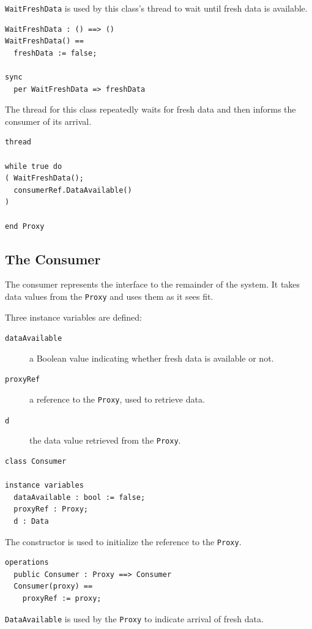 \documentclass{overturerepchap}
\begin{document}
\texttt{WaitFreshData} is used by this class's thread to wait until
fresh data is available.

\begin{lstlisting}
WaitFreshData : () ==> ()
WaitFreshData() ==
  freshData := false;

sync
  per WaitFreshData => freshData
\end{lstlisting}

The thread for this class repeatedly waits for fresh data and then
informs the consumer of its arrival.

\begin{lstlisting}
thread

while true do
( WaitFreshData();
  consumerRef.DataAvailable()
)

end Proxy
\end{lstlisting}

\subsection{The Consumer}

The consumer represents the interface to the remainder of the
system. It takes data values from the \texttt{Proxy} and uses them as
it sees fit.

Three instance variables are defined:

\begin{description}
\item[\texttt{dataAvailable}] a Boolean value indicating whether fresh
data is available or not.
\item[\texttt{proxyRef}] a reference to the \texttt{Proxy}, used to
retrieve data.
\item[\texttt{d}] the data value retrieved from the \texttt{Proxy}.
\end{description}

\begin{lstlisting}
class Consumer

instance variables
  dataAvailable : bool := false;
  proxyRef : Proxy;
  d : Data
\end{lstlisting}

The constructor is used to initialize the reference to the
\texttt{Proxy}.

\begin{lstlisting}
operations
  public Consumer : Proxy ==> Consumer
  Consumer(proxy) ==
    proxyRef := proxy;
\end{lstlisting}

\texttt{DataAvailable} is used by the \texttt{Proxy} to indicate
arrival of fresh data.
\end{document}
